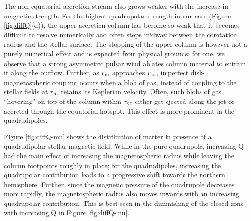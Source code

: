 \documentclass[fleqn,usenatbib]{mnras}
\begin{document}
 \begin{figure*}
   \centering
    \caption{Effect of increasing quadrupolar contribution on the accretion flow (right to left). Different panels represent the logarithmic density profiles at t = $20270 r_g/c$ for different dipolar and quadrupolar contribution, where Q and $\mu$ are varied such that the surface polar field strength stays constant. All the labels are same as in Figure \ref{fig:diffmudipole}.}
    \label{fig:diffQ-mu}
    \vspace{-4mm}
 \end{figure*}
  The non-equatorial accretion stream also grows weaker with the increase in magnetic strength. 
 For the highest quadrupolar strength in our case (Figure \ref{fig:diffQ}(d)), the upper accretion column has become so weak that it becomes difficult to resolve numerically and often stops midway between the corotation radius and the stellar surface. 
 The stopping of the upper column is however not a purely numerical effect and is expected from physical grounds: for one, 
 we observe that a strong asymmetric pulsar wind ablates column material to entrain it along the outflow.  Further, as $r_{\rm m}$ approaches $r_{\rm co}$, imperfect disk-magnetospheric coupling occurs when a blob of gas, instead of coupling to the stellar fields at $r_{\rm m}$ retains its Keplerian velocity. Often, such blobs of gas ``hovering'' on top of the column within $r_{\rm co}$  either get ejected along the jet or accreted through the equatorial hotspot. This effect is more prominent in the quadrudipoles. 

Figure \ref{fig:diffQ-mu} shows the distribution of matter in presence of a quadrudipolar stellar magnetic field. While in the pure quadrupole, increasing Q had the main effect of increasing the magnetospheric radius while leaving the column footpoints roughly in place; for the quadrudipoles, increasing the quadrupolar contribution leads to a progressive shift towards the northern hemisphere.  
Further, since the magnetic pressure of the quadrupole decreases more rapidly, the magnetospheric radius also moves inwards with an increasing quadrupolar contribution.  This is best seen in the diminishing of the closed zone with increasing Q in Figure \ref{fig:diffQ-mu}.  
\end{document}
